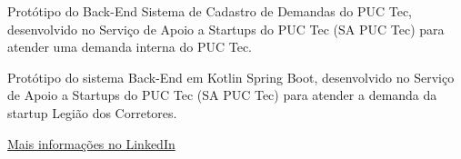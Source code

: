 
Protótipo do Back-End Sistema de Cadastro de Demandas do PUC Tec, desenvolvido no Serviço de Apoio a Startups do PUC Tec (SA PUC Tec) para atender uma demanda interna do PUC Tec.\\
\divider

Protótipo do sistema Back-End em Kotlin Spring Boot, desenvolvido no Serviço de Apoio a Startups do PUC Tec (SA PUC Tec) para atender a demanda da startup Legião dos Corretores.\\
\divider

{\large\color{emphasis}\href{https://www.linkedin.com/in/henriquemcc/details/projects/}{Mais informações no LinkedIn}}